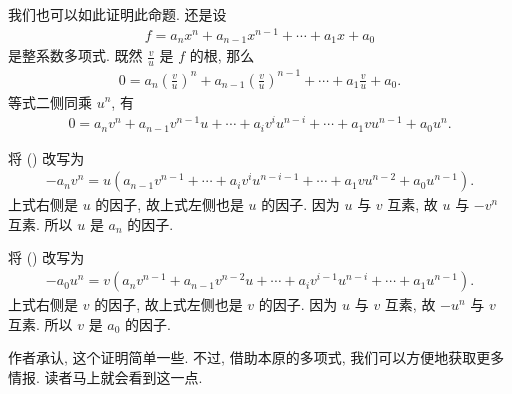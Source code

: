 \begin{remark}
    我们也可以如此证明此命题. 还是设
    \begin{align*}
        f = a_n x^n + a_{n-1} x^{n-1} + \cdots + a_1 x + a_0
    \end{align*}
    是整系数多项式. 既然 $\frac{v}{u}$ 是 $f$ 的根, 那么
    \begin{align*}
        0 = a_n \left( \frac{v}{u} \right)^n + a_{n-1} \left( \frac{v}{u} \right)^{n-1} + \cdots + a_1 \frac{v}{u} + a_0.
    \end{align*}
    等式二侧同乘 $u^n$, 有
    \begin{align*}
        0 = a_n v^n + a_{n-1} v^{n-1} u + \cdots + a_{i} v^{i} u^{n-i} + \cdots + a_1 v u^{n-1} + a_0 u^n. \tag*{(\myStar)}
    \end{align*}

    将 (\myStar) 改写为
    \begin{align*}
        -a_n v^n = u (a_{n-1} v^{n-1} + \cdots + a_{i} v^{i} u^{n-i-1} + \cdots + a_1 v u^{n-2} + a_0 u^{n-1}).
    \end{align*}
    上式右侧是 $u$ 的因子, 故上式左侧也是 $u$ 的因子. 因为 $u$ 与 $v$ 互素, 故 $u$ 与 $-v^n$ 互素. 所以 $u$ 是 $a_n$ 的因子.

    将 (\myStar) 改写为
    \begin{align*}
        -a_0 u^n = v (a_n v^{n-1} + a_{n-1} v^{n-2} u + \cdots + a_{i} v^{i-1} u^{n-i} + \cdots + a_1 u^{n-1}).
    \end{align*}
    上式右侧是 $v$ 的因子, 故上式左侧也是 $v$ 的因子. 因为 $u$ 与 $v$ 互素, 故 $-u^n$ 与 $v$ 互素. 所以 $v$ 是 $a_0$ 的因子.

    作者承认, 这个证明简单一些. 不过, 借助本原的多项式, 我们可以方便地获取更多情报. 读者马上就会看到这一点.
\end{remark}

